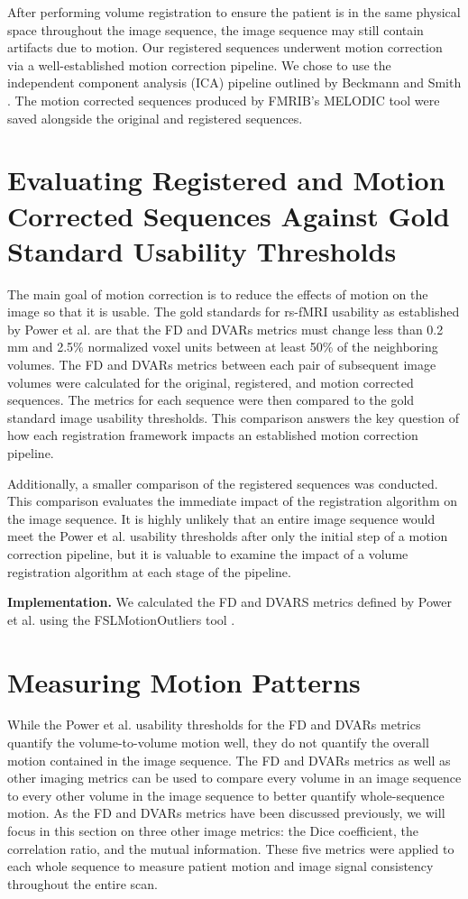 After performing volume registration to ensure the patient is in the same physical space throughout the image sequence, the image sequence may still contain artifacts due to motion. Our registered sequences underwent motion correction via a well-established motion correction pipeline. We chose to use the independent component analysis (ICA) pipeline outlined by Beckmann and Smith \cite{Beckmann2004}. The motion corrected sequences produced by FMRIB's MELODIC tool were saved alongside the original and registered sequences.  

\section{Evaluating Registered and Motion Corrected Sequences Against Gold Standard Usability Thresholds}

The main goal of motion correction is to reduce the effects of motion on the image so that it is usable. The gold standards for rs-fMRI usability as established by Power et al. are that the FD and DVARs metrics must change less than 0.2 mm and 2.5\% normalized voxel units between at least 50\% of the neighboring volumes. The FD and DVARs metrics between each pair of subsequent image volumes were calculated for the original, registered, and motion corrected sequences. The metrics for each sequence were then compared to the gold standard image usability thresholds. This comparison answers the key question of how each registration framework impacts an established motion correction pipeline.

Additionally, a smaller comparison of the registered sequences was conducted. This comparison evaluates the immediate impact of the registration algorithm on the image sequence. It is highly unlikely that an entire image sequence would meet the Power et al. usability thresholds after only the initial step of a motion correction pipeline, but it is valuable to examine the impact of a volume registration algorithm at each stage of the pipeline. 

\textbf{Implementation.} We calculated the FD and DVARS metrics defined by Power et al. using the FSLMotionOutliers tool \cite{Power2012}. 

\section{Measuring Motion Patterns}

While the Power et al. usability thresholds for the FD and DVARs metrics quantify the volume-to-volume motion well, they do not quantify the overall motion contained in the image sequence. The FD and DVARs metrics as well as other imaging metrics can be used to compare every volume in an image sequence to every other volume in the image sequence to better quantify whole-sequence motion. As the FD and DVARs metrics have been discussed previously, we will focus in this section on three other image metrics: the Dice coefficient, the correlation ratio, and the mutual information. These five metrics were applied to each whole sequence to measure patient motion and image signal consistency throughout the entire scan.

